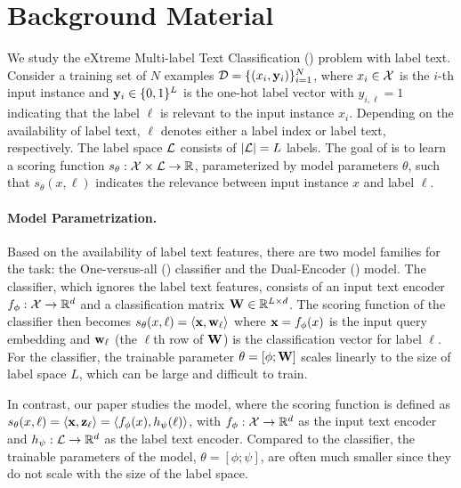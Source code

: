 \vspace{-.9em}
\section{Background Material}
\label{sec:background}

\vspace{-.4em}
We study the eXtreme Multi-label Text Classification (\XMC) problem with label text.
Consider a training set of $N$ examples ${\mathcal{D}}=\{ (x_i, {\mathbf{y}}_i) \}_{i=1}^N$,
where $x_i \in {\mathcal{X}}$ is the $i$-th input instance and ${\mathbf{y}}_i \in \{0, 1\}^L$ is the one-hot label vector with $y_{i,\ell}=1$ indicating that the label $\ell$ is relevant to the input instance $x_i$.
Depending on the availability of label text, $\ell$ denotes either a label index or label text, respectively.
The label space ${\mathcal{L}}$ consists of $|{\mathcal{L}}|=L$ labels.
The goal of \XMC is to learn a scoring function $s_{\theta}: {\mathcal{X}} \times {\mathcal{L}} \rightarrow {\mathbb{R}}$, parameterized by model parameters $\theta$, such that $s_{\theta}(x, \ell)$ indicates the relevance between input instance $x$ and label $\ell$.

\vspace{-.5em}
\paragraph{Model Parametrization.}
Based on the availability of label text features, there are two model families for the \XMC task: the One-versus-all (\OVA) classifier and the Dual-Encoder (\DE) model.
The \OVA classifier, which ignores the label text features, consists of an input text encoder $f_{\phi}: {\mathcal{X}} \rightarrow {\mathbb{R}}^d$ and a classification matrix ${\mathbf{W}} \in {\mathbb{R}}^{L \times d}$. 
The scoring function of the \OVA classifier then becomes $s_{\theta}(x,\ell)=\langle {\mathbf{x}} , {\mathbf{w}}_\ell \rangle$ where ${\mathbf{x}} = f_{\phi}(x)$ is the input query embedding and ${\mathbf{w}}_\ell$ (the $\ell$th row of ${\mathbf{W}}$) is the classification vector for label $\ell$.
For the \OVA classifier, the trainable parameter $\theta=[\phi; {\mathbf{W}}]$ scales linearly to the size of label space $L$, which can be large and difficult to train.

In contrast, our paper studies the \DE model, where the scoring function is defined as $s_{\theta}(x, \ell) = \langle {\mathbf{x}}, {\mathbf{z}}_\ell \rangle = \langle f_\phi(x), h_\psi(\ell) \rangle$, with $f_\phi: {\mathcal{X}} \rightarrow {\mathbb{R}}^d$ as the input text encoder and $h_\psi: {\mathcal{L}} \rightarrow {\mathbb{R}}^d$ as the label text encoder. 
Compared to the \OVA classifier, the trainable parameters of the \DE model, $\theta=[\phi; \psi]$, are often much smaller since they do not scale with the size of the label space.


